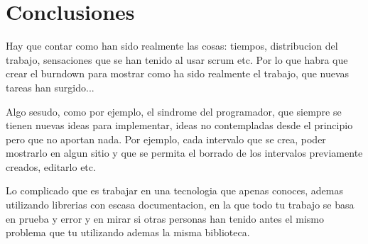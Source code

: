 \section{Conclusiones}
Hay que contar como han sido realmente las cosas: tiempos, distribucion del trabajo, 
sensaciones que se han tenido al usar scrum etc. Por lo que habra que crear el
burndown para mostrar como ha sido realmente el trabajo, que nuevas tareas han surgido...

Algo sesudo, como por ejemplo, el sindrome del programador, que siempre se tienen nuevas
ideas para implementar, ideas no contempladas desde el principio pero que no aportan nada.
Por ejemplo, cada intervalo que se crea, poder mostrarlo en algun sitio y que se permita
el borrado de los intervalos previamente creados, editarlo etc.

Lo complicado que es trabajar en una tecnologia que apenas conoces, ademas utilizando
librerias con escasa documentacion, en la que todo tu trabajo se basa en prueba y error
y en mirar si otras personas han tenido antes el mismo problema que tu utilizando
ademas la misma biblioteca.